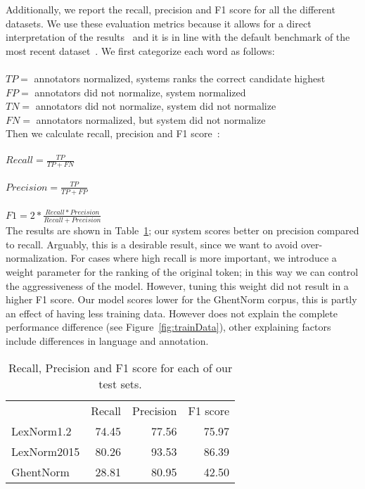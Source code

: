 \documentclass[a4paper,10pt,twoside]{article}
\begin{document}
Additionally, we report the recall, precision and F1 score for all the
different datasets. We use these evaluation metrics because it allows for a
direct interpretation of the results~\cite{REYNAERT08.477} and it is in line
with the default benchmark of the most recent
dataset~\cite{baldwin-EtAl:2015:WNUT}. We first categorize each word as
follows:
\\
\\
\noindent$TP = $ annotators normalized, systems ranks the correct candidate highest \\
\noindent$FP = $ annotators did not normalize, system normalized \\
\noindent$TN = $ annotators did not normalize, system did not normalize \\
\noindent$FN = $ annotators normalized, but system did not normalize \\


Then we calculate recall, precision and F1 score~\cite{rijsbergen1979v}: 
\\
\\
$Recall = \frac{TP}{TP + FN}$ \\ \\ $Precision = \frac{TP}{TP + FP}$\\ \\
$F1 = 2 * \frac{Recall * Precision}{Recall + Precision}$\\

The results are shown in Table~\ref{tab:finalTest}; our system scores better on
precision compared to recall.  Arguably, this is a desirable result, since we
want to avoid over-normalization. For cases where high recall is more
important, we introduce a weight parameter for the ranking of the original
token; in this way we can control the aggressiveness of the model. However,
tuning this weight did not result in a higher F1 score. Our model scores lower
for the GhentNorm corpus, this is partly an effect of having less training data.
However does not explain the complete performance difference (see
Figure~\ref{fig:trainData}), other explaining factors include differences in
language and annotation.

\begin{table}
    \centering
    \begin{tabular}{l r r r}
                    & Recall & Precision & F1 score \\
        LexNorm1.2  & 74.45  & 77.56     & 75.97 \\
        LexNorm2015 & 80.26  & 93.53     & 86.39 \\
        GhentNorm   & 28.81  & 80.95     & 42.50 \\
    \end{tabular}
    \caption{Recall, Precision and F1 score for each of our test sets.}
    \label{tab:finalTest}
\end{table}
\end{document}
